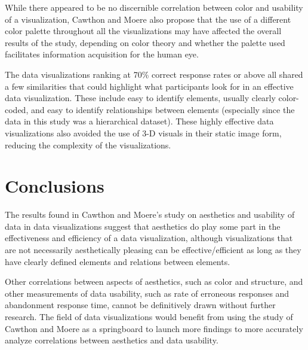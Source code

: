\documentclass[twocolumn]{article}
\newcommand{\forceindent}{\leavevmode{\parindent=2em\indent}}
\begin{document}
		\forceindent While there appeared to be no discernible correlation between color and usability of a visualization, Cawthon and Moere also propose that the use of a different color palette throughout all the visualizations may have affected the overall results of the study, depending on color theory and whether the palette used facilitates information acquisition for the human eye.
		
		\forceindent The data visualizations ranking at 70\% correct response rates or above all shared a few similarities that could highlight what participants look for in an effective data visualization. These include easy to identify elements, usually clearly color-coded, and easy to identify relationships between elements (especially since the data in this study was a hierarchical dataset). These highly effective data visualizations also avoided the use of 3-D visuals in their static image form, reducing the complexity of the visualizations.
		
	\section{Conclusions}
	
	\forceindent The results found in Cawthon and Moere's study on aesthetics and usability of data in data visualizations suggest that aesthetics do play some part in the effectiveness and efficiency of a data visualization, although visualizations that are not necessarily aesthetically pleasing can be effective/efficient as long as they have clearly defined elements and relations between elements.
	
	\forceindent Other correlations between aspects of aesthetics, such as color and structure, and other measurements of data usability, such as rate of erroneous responses and abandonment response time, cannot be definitively drawn without further research. The field of data visualizations would benefit from using the study of Cawthon and Moere as a springboard to launch more findings to more accurately analyze correlations between aesthetics and data usability.
	

	
	
	
\end{document}
